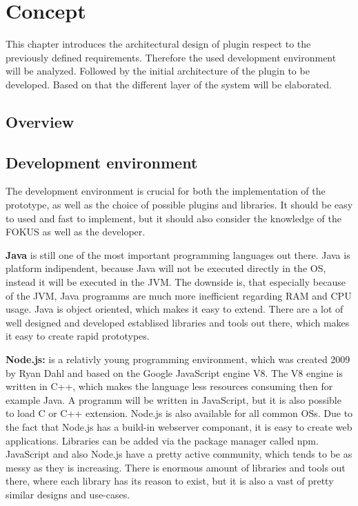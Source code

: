 \acresetall

\chapter{Concept}\label{chapter:concept}
This chapter introduces the architectural design of plugin respect to the previously defined requirements.
Therefore the used development environment will be analyzed.
Followed by the initial architecture of the plugin to be developed.
Based on that the different layer of the system will be elaborated.

\section{Overview}
\doit

\section{Development environment}
The development environment is crucial for both the implementation of the prototype, as well as the choice of possible plugins and libraries.
It should be easy to used and fast to implement, but it should also consider the knowledge of the \ac{FOKUS} as well as the developer.

\textbf{Java } is still one of the most important programming languages out there.\autocite[cf.]{ProgramminLanguage:2017}
Java is platform indipendent, because Java will not be executed directly in the \ac{OS}, instead it will be executed in the \ac{JVM}.
The downside is, that especially because of the \ac{JVM}, Java programms are much more inefficient regarding \ac{RAM} and \ac{CPU} usage.
Java is object oriented, which makes it easy to extend.
There are a lot of well designed and developed establised libraries and tools out there, which makes it easy to create rapid prototypes.

\textbf{Node.js:} is a relativly young programming environment, which was created 2009 by Ryan Dahl and based on the Google JavaScript engine V8.
The V8 engine is written in C++, which makes the language less resources consuming then for example Java.
A programm will be written in JavaScript, but it is also possible to load C or C++ extension.
Node.js is also available for all common \acp{OS}.
Due to the fact that Node.js has a build-in webserver componant, it is easy to create web applications.
Libraries can be added via the package manager called npm.
JavaScript and also Node.js have a pretty active community, which tends to be as messy as they is increasing.
There is enormous amount of libraries and tools out there, where each library has its reason to exist, but it is also a vast of pretty similar designs and use-cases.

